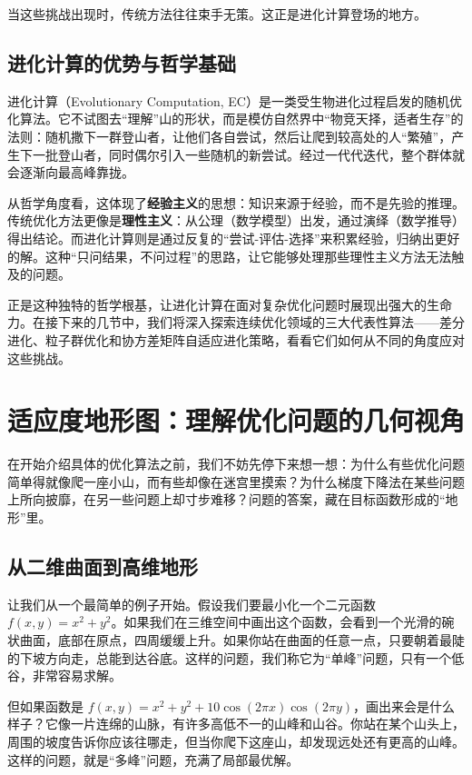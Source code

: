 \documentclass[lang=cn,zihao=-4,a4paper,fontset=windows]{beautybook}
\begin{document}
当这些挑战出现时，传统方法往往束手无策。这正是进化计算登场的地方。

\subsection{进化计算的优势与哲学基础}

进化计算（Evolutionary Computation, EC）是一类受生物进化过程启发的随机优化算法。它不试图去“理解”山的形状，而是模仿自然界中“物竞天择，适者生存”的法则：随机撒下一群登山者，让他们各自尝试，然后让爬到较高处的人“繁殖”，产生下一批登山者，同时偶尔引入一些随机的新尝试。经过一代代迭代，整个群体就会逐渐向最高峰靠拢。

从哲学角度看，这体现了\textbf{经验主义}的思想：知识来源于经验，而不是先验的推理。传统优化方法更像是\textbf{理性主义}：从公理（数学模型）出发，通过演绎（数学推导）得出结论。而进化计算则是通过反复的“尝试-评估-选择”来积累经验，归纳出更好的解。这种“只问结果，不问过程”的思路，让它能够处理那些理性主义方法无法触及的问题。

正是这种独特的哲学根基，让进化计算在面对复杂优化问题时展现出强大的生命力。在接下来的几节中，我们将深入探索连续优化领域的三大代表性算法——差分进化、粒子群优化和协方差矩阵自适应进化策略，看看它们如何从不同的角度应对这些挑战。

\section{适应度地形图：理解优化问题的几何视角}

在开始介绍具体的优化算法之前，我们不妨先停下来想一想：为什么有些优化问题简单得就像爬一座小山，而有些却像在迷宫里摸索？为什么梯度下降法在某些问题上所向披靡，在另一些问题上却寸步难移？问题的答案，藏在目标函数形成的“地形”里。

\subsection{从二维曲面到高维地形}

让我们从一个最简单的例子开始。假设我们要最小化一个二元函数 $f(x,y) = x^2 + y^2$。如果我们在三维空间中画出这个函数，会看到一个光滑的碗状曲面，底部在原点，四周缓缓上升。如果你站在曲面的任意一点，只要朝着最陡的下坡方向走，总能到达谷底。这样的问题，我们称它为“单峰”问题，只有一个低谷，非常容易求解。

但如果函数是 $f(x,y) = x^2 + y^2 + 10\cos(2\pi x)\cos(2\pi y)$，画出来会是什么样子？它像一片连绵的山脉，有许多高低不一的山峰和山谷。你站在某个山头上，周围的坡度告诉你应该往哪走，但当你爬下这座山，却发现远处还有更高的山峰。这样的问题，就是“多峰”问题，充满了局部最优解。
\end{document}
